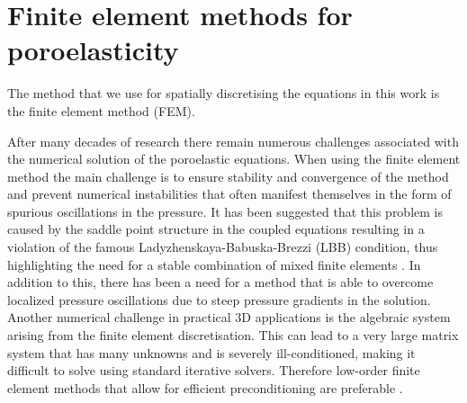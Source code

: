 \section{Finite element methods for poroelasticity}
The method that we use for spatially discretising the equations in this work is the finite element method (FEM).%

After many decades of research there remain numerous challenges associated with the numerical solution of the poroelastic equations. When using the finite element method the main challenge is to ensure stability and convergence of the method and prevent numerical instabilities that often manifest themselves in the form of spurious oscillations in the pressure. It has been suggested that this problem is caused by the saddle point structure in the coupled equations resulting in a violation of the famous Ladyzhenskaya-Babuska-Brezzi (LBB) condition, thus highlighting the need for a stable combination of mixed finite elements \citep{haga2012causes}. In addition to this, there has been a need for a method that is able to overcome localized pressure oscillations due to steep pressure gradients in the solution. Another numerical challenge in practical 3D applications is the algebraic system arising from the finite element discretisation. This can lead to a very large matrix system that has many unknowns and is severely ill-conditioned, making it difficult to solve using standard iterative solvers. Therefore low-order finite element methods that allow for efficient preconditioning are preferable \citep{white2011block,ferronato2010fully}.
%
